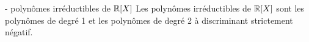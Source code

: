 


\begin{theoreme}{16.100}{ - polynômes irréductibles de $\mathbb{R}[X]$}
    Les polynômes irréductibles de $\mathbb{R}[X]$ sont les polynômes de degré 1 et les polynômes de degré 2 à discriminant strictement négatif.
\end{theoreme}
